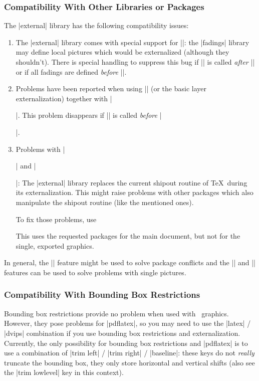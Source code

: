 \subsubsection{Compatibility With Other Libraries or Packages}
The |external| library has the following compatibility issues:
\begin{enumerate}
	\item The |external| library comes with special support for |\usetikzlibrary{fadings}|: the |fadings| library may define local pictures which would be externalized (although they shouldn't). There is special handling to suppress this bug if |\tikzexternalize| is called \emph{after} |\usetikzlibrary{fadings}| or if all fadings are defined \emph{before} |\tikzexternalize|.

	\item Problems have been reported when using |\tikzexternalize| (or the basic layer externalization) together with |\usepackage{glossary}|. This problem disappears if |\tikzexternalize| is called \emph{before} |\usepackage{glossary}|.

	\item Problems with |\usepackage{pdfpages}| and |\usepackage{vmargin}|: The |external| library replaces the current shipout routine of \TeX\ during its externalization. This might raise problems with other packages which also manipulate the shipout routine (like the mentioned ones).

	To fix those problems, use
\begin{codeexample}

\usetikzlibrary{external}

%
\end{codeexample}
	This uses the requested packages for the main document, but not for the single, exported graphics.
\end{enumerate}

In general, the |\tikzifexternalizing| feature might be used to solve package conflicts and the |\tikzexternaldisable| and |\tikzexternalenable| features can be used to solve problems with single pictures.

\subsubsection{Compatibility With Bounding Box Restrictions}
Bounding box restrictions provide no problem when used with \eps\ graphics. However, they pose problems for |pdflatex|, so you may need to use the |latex| / |dvips| combination if you use bounding box restrictions and externalization. Currently, the only possibility for bounding box restrictions and |pdflatex| is to use a combination of |trim left| / |trim right| / |baseline|: these keys do not \emph{really} truncate the bounding box, they only store horizontal and vertical shifts (also see the |trim lowlevel| key in this context).

